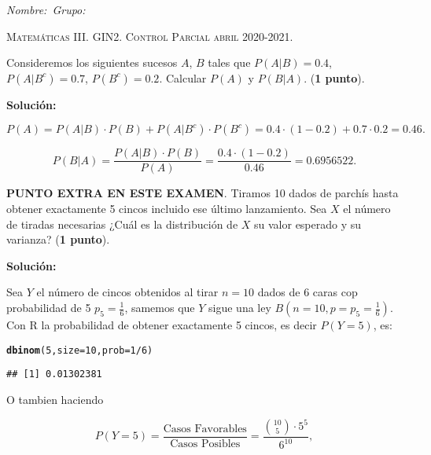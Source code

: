 \documentclass[12pt]{article}\usepackage[]{graphicx}\usepackage[]{color}
\makeatletter
\newcommand{\hlnum}[1]{\textcolor[rgb]{0.686,0.059,0.569}{#1}}%
\newcommand{\hlopt}[1]{\textcolor[rgb]{0,0,0}{#1}}%
\newcommand{\hlstd}[1]{\textcolor[rgb]{0.345,0.345,0.345}{#1}}%
\newcommand{\hlkwc}[1]{\textcolor[rgb]{0.333,0.667,0.333}{#1}}%
\newcommand{\hlkwd}[1]{\textcolor[rgb]{0.737,0.353,0.396}{\textbf{#1}}}%
\newenvironment{kframe}{%
 \def\at@end@of@kframe{}%
 \ifinner\ifhmode%
  \def\at@end@of@kframe{\end{minipage}}%
  \begin{minipage}{\columnwidth}%
 \fi\fi%
 \def\FrameCommand##1{\hskip\@totalleftmargin \hskip-\fboxsep
 \colorbox{shadecolor}{##1}\hskip-\fboxsep
     \hskip-\linewidth \hskip-\@totalleftmargin \hskip\columnwidth}%
 \MakeFramed {\advance\hsize-\width
   \@totalleftmargin\z@ \linewidth\hsize
   \@setminipage}}%
 {\par\unskip\endMakeFramed%
 \at@end@of@kframe}
\newenvironment{knitrout}{}{} %
\newcounter{problemes}
\newcounter{punts} \def\thepunts{\arabic{punts}}
\def\probl{\addtocounter{problemes}{1} \setcounter{punts}{0}
\medskip\noindent{\bf \theproblemes) }}
\makeatother
\begin{document}
\noindent\emph{Nombre:}\hfill\hfill\hfill\hfill\hfill\hfill\hfill\ \emph{Grupo:}\hfill \vspace*{-2ex}

\begin{center}
\textsc{Matemáticas III. GIN2. Control Parcial abril  2020-2021.}
\end{center}

\setcounter{problemes}{0}

\probl  Consideremos los siguientes sucesos $A$, $B$ tales que
$P(A|B)=0.4$, $P(A|B^c)=0.7$, $P(B^c)=0.2$. Calcular $P(A)$ y $P(B|A)$.
(\textbf{1 punto}).

\textbf{Solución:}




$$P(A)=P(A|B)\cdot P(B)+P(A|B^c)\cdot P(B^c)=0.4\cdot (1-0.2)+ 0.7\cdot 0.2=0.46.$$

$$P(B|A)=\frac{P(A|B)\cdot P(B)}{P(A)}=\frac{0.4\cdot (1-0.2)}{0.46}=0.6956522.$$


\probl \textbf{\textsc{PUNTO EXTRA EN ESTE EXAMEN}}. Tiramos 10 dados de parchís hasta obtener exactamente 5 cincos incluido ese último lanzamiento.
Sea $X$  el número de tiradas necesarias ¿Cuál es la distribución de $X$ su valor esperado y su varianza? (\textbf{1 punto}).

\textbf{Solución:}

Sea $Y$ el número de cincos obtenidos al tirar $n=10$ dados de 6 caras cop probabilidad de 5 $p_5=\frac{1}{6}$, samemos que $Y$ sigue una ley $B(n=10,p=p_5=\frac{1}{6})$.  Con R la probabilidad de obtener exactamente 5 cincos, es decir  $P(Y=5)$, es:

\begin{knitrout}
\color{fgcolor}\begin{kframe}
\begin{alltt}
\hlkwd{dbinom}\hlstd{(}\hlnum{5}\hlstd{,}\hlkwc{size}\hlstd{=}\hlnum{10}\hlstd{,}\hlkwc{prob}\hlstd{=}\hlnum{1}\hlopt{/}\hlnum{6}\hlstd{)}
\end{alltt}
\begin{verbatim}
## [1] 0.01302381
\end{verbatim}
\end{kframe}
\end{knitrout}

O tambien haciendo 

$$P(Y=5)=\frac{\mbox{Casos Favorables}}{\mbox{Casos Posibles}}
= \frac{{10 \choose 5}\cdot 5^5}{6^{10}},$$
\end{document}

